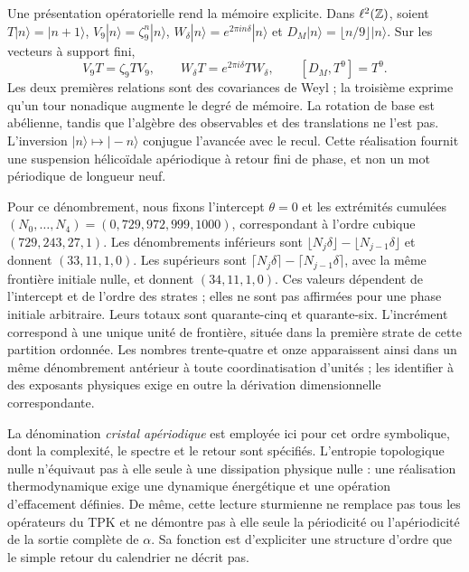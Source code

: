 Une présentation opératorielle rend la mémoire explicite. Dans \(\ell^2(\mathbb Z)\), soient \(T|n\rangle=|n+1\rangle\), \(V_9|n\rangle=\zeta_9^n|n\rangle\), \(W_\delta|n\rangle=e^{2\pi i n\delta}|n\rangle\) et \(D_M|n\rangle=\lfloor n/9\rfloor|n\rangle\). Sur les vecteurs à support fini,
\begin{equation}
 V_9T=\zeta_9TV_9,\qquad
 W_\delta T=e^{2\pi i\delta}TW_\delta,\qquad
 [D_M,T^9]=T^9.
 \label{eq:weyl-relojes}
\end{equation}
Les deux premières relations sont des covariances de Weyl ; la troisième exprime qu'un tour nonadique augmente le degré de mémoire. La rotation de base est abélienne, tandis que l'algèbre des observables et des translations ne l'est pas. L'inversion \(|n\rangle\mapsto|-n\rangle\) conjugue l'avancée avec le recul. Cette réalisation fournit une suspension hélicoïdale apériodique à retour fini de phase, et non un mot périodique de longueur neuf.



Pour ce dénombrement, nous fixons l'intercept \(\theta=0\) et les extrémités cumulées \((N_0,\ldots,N_4)=(0,729,972,999,1000)\), correspondant à l'ordre cubique \((729,243,27,1)\). Les dénombrements inférieurs sont \(\lfloor N_j\delta\rfloor-\lfloor N_{j-1}\delta\rfloor\) et donnent \((33,11,1,0)\). Les supérieurs sont \(\lceil N_j\delta\rceil-\lceil N_{j-1}\delta\rceil\), avec la même frontière initiale nulle, et donnent \((34,11,1,0)\). Ces valeurs dépendent de l'intercept et de l'ordre des strates ; elles ne sont pas affirmées pour une phase initiale arbitraire. Leurs totaux sont quarante-cinq et quarante-six. L'incrément correspond à une unique unité de frontière, située dans la première strate de cette partition ordonnée. Les nombres trente-quatre et onze apparaissent ainsi dans un même dénombrement antérieur à toute coordinatisation d'unités ; les identifier à des exposants physiques exige en outre la dérivation dimensionnelle correspondante.

La dénomination \emph{cristal apériodique} est employée ici pour cet ordre symbolique, dont la complexité, le spectre et le retour sont spécifiés. L'entropie topologique nulle n'équivaut pas à elle seule à une dissipation physique nulle : une réalisation thermodynamique exige une dynamique énergétique et une opération d'effacement définies. De même, cette lecture sturmienne ne remplace pas tous les opérateurs du TPK et ne démontre pas à elle seule la périodicité ou l'apériodicité de la sortie complète de \(\alpha\). Sa fonction est d'expliciter une structure d'ordre que le simple retour du calendrier ne décrit pas.





